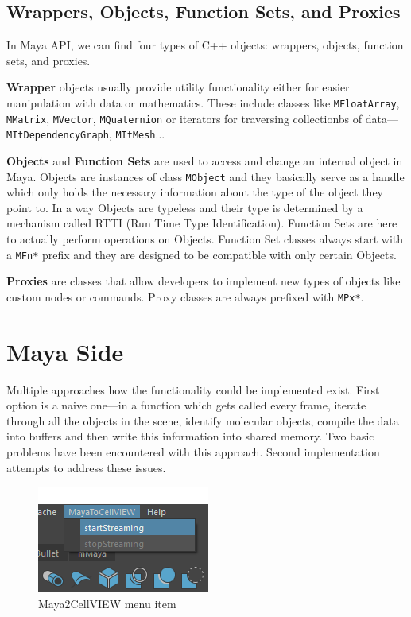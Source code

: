 \documentclass[
  digital, %
  table,   %
  nolof,     %
  nolot,     %
  oneside,
]{fithesis3}
\begin{document}
\subsection{Wrappers, Objects, Function Sets, and Proxies}
In Maya API, we can find four types of C++ objects: wrappers, objects, function sets, and proxies.

\textbf{Wrapper} objects usually provide utility functionality either for easier manipulation with data or mathematics. These include classes like \texttt{MFloatArray}, \texttt{MMatrix}, \texttt{MVector}, \texttt{MQuaternion} or iterators for traversing collectionbs of data—\texttt{MItDependencyGraph}, \texttt{MItMesh}...

\textbf{Objects} and \textbf{Function Sets} are used to access and change an internal object in Maya. Objects are instances of class \texttt{MObject} and they basically serve as a handle which only holds the necessary information about the type of the object they point to. In a way Objects are typeless and their type is determined by a mechanism called RTTI (Run Time Type Identification). Function Sets are here to actually perform operations on Objects. Function Set classes always start with a \texttt{MFn*} prefix and they are designed to be compatible with only certain Objects.

\textbf{Proxies} are classes that allow developers to implement new types of objects like custom nodes or commands. Proxy classes are always prefixed with \texttt{MPx*}.

\section{Maya Side}
Multiple approaches how the functionality could be implemented exist. First option is a naive one—in a function which gets called every frame, iterate through all the objects in the scene, identify molecular objects, compile the data into buffers and then write this information into shared memory. Two basic problems have been encountered with this approach. Second implementation attempts to address these issues.

\begin{figure}
  \centering
  \includegraphics{images/maya-to-unity-menu.png}
  \caption{Maya2CellVIEW menu item}
  \label{fig:maya-menu-item}
\end{figure}
\end{document}
